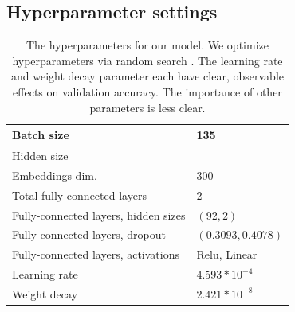 \subsection{Hyperparameter settings}\label{s:params}


\begin{table}[]
\begin{tabular}{@{}ll@{}}
\toprule
Batch size         & 135                      \\ \midrule
Hidden size        &                          \\
Embeddings dim.    & 300                      \\
Total fully-connected layers & 2                        \\
Fully-connected layers, hidden sizes & $(92, 2)$ \\
Fully-connected layers, dropout & $(0.3093, 0.4078)$ \\
Fully-connected layers, activations        & Relu, Linear             \\
Learning rate      & $4.593 * 10^{-4}$   \\
Weight decay       & $2.421 * 10^{-8}$   \\ \bottomrule
\end{tabular}
\caption{The hyperparameters for our model. We optimize hyperparameters via random search \cite{Bergstra2012RandomSF}. The learning rate and weight decay parameter each have clear, observable effects on validation accuracy. The importance of other parameters is less clear. } 
\end{table}

